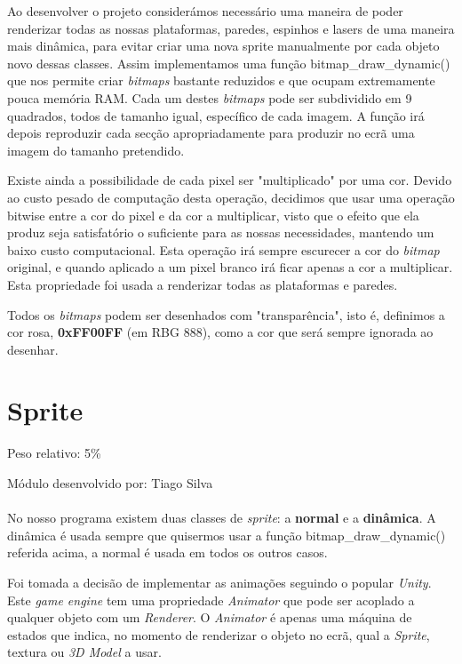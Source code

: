 \documentclass{report}
\begin{document}
Ao desenvolver o projeto considerámos necessário uma maneira de poder renderizar todas as nossas plataformas, paredes, espinhos e lasers de uma maneira mais dinâmica, para evitar criar uma nova sprite manualmente por cada objeto novo dessas classes. Assim implementamos uma função bitmap\_draw\_dynamic() que nos permite criar \textit{bitmaps} bastante reduzidos e que ocupam extremamente pouca memória RAM. Cada um destes \textit{bitmaps} pode ser subdividido em 9 quadrados, todos de tamanho igual, específico de cada imagem. A função irá depois reproduzir cada secção apropriadamente para produzir no ecrã uma imagem do tamanho pretendido.

Existe ainda a possibilidade de cada pixel ser "multiplicado" por uma cor. Devido ao custo pesado de computação desta operação, decidimos que usar uma operação bitwise entre a cor do pixel e da cor a multiplicar, visto que o efeito que ela produz seja satisfatório o suficiente para as nossas necessidades, mantendo um baixo custo computacional. Esta operação irá sempre escurecer a cor do \textit{bitmap} original, e quando aplicado a um pixel branco irá ficar apenas a cor a multiplicar. Esta propriedade foi usada a renderizar todas as plataformas e paredes. 

Todos os \textit{bitmaps} podem ser desenhados com "transparência", isto é, definimos a cor rosa, \textbf{0xFF00FF} (em RBG 888), como a cor que será sempre ignorada ao desenhar. \newline
 
\section{Sprite}

Peso relativo: 5\%

Módulo desenvolvido por: Tiago Silva

\paragraph{}
No nosso programa existem duas classes de \textit{sprite}: a \textbf{normal} e a \textbf{dinâmica}. A dinâmica é usada sempre que quisermos usar a função bitmap\_draw\_dynamic() referida acima, a normal é usada em todos os outros casos.

Foi tomada a decisão de implementar as animações seguindo o popular \textit{Unity}. Este \textit{game engine} tem uma propriedade \textit{Animator} que pode ser acoplado a qualquer objeto com um \textit{Renderer}. O \textit{Animator} é apenas uma máquina de estados que indica, no momento de renderizar o objeto no ecrã, qual a \textit{Sprite}, textura ou \textit{3D Model} a usar.
\end{document}
